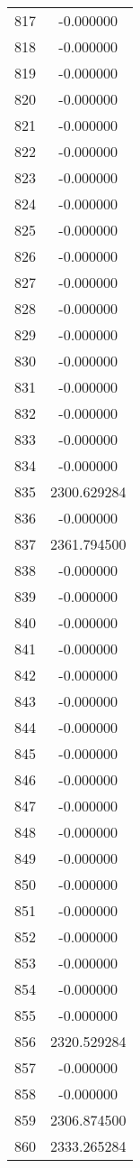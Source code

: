\documentclass[12pt]{article}
\begin{document}
\begin{longtable}{@{}cc@{}}
817 & -0.000000 \\
818 & -0.000000 \\
819 & -0.000000 \\
820 & -0.000000 \\
821 & -0.000000 \\
822 & -0.000000 \\
823 & -0.000000 \\
824 & -0.000000 \\
825 & -0.000000 \\
826 & -0.000000 \\
827 & -0.000000 \\
828 & -0.000000 \\
829 & -0.000000 \\
830 & -0.000000 \\
831 & -0.000000 \\
832 & -0.000000 \\
833 & -0.000000 \\
834 & -0.000000 \\
835 & 2300.629284 \\
836 & -0.000000 \\
837 & 2361.794500 \\
838 & -0.000000 \\
839 & -0.000000 \\
840 & -0.000000 \\
841 & -0.000000 \\
842 & -0.000000 \\
843 & -0.000000 \\
844 & -0.000000 \\
845 & -0.000000 \\
846 & -0.000000 \\
847 & -0.000000 \\
848 & -0.000000 \\
849 & -0.000000 \\
850 & -0.000000 \\
851 & -0.000000 \\
852 & -0.000000 \\
853 & -0.000000 \\
854 & -0.000000 \\
855 & -0.000000 \\
856 & 2320.529284 \\
857 & -0.000000 \\
858 & -0.000000 \\
859 & 2306.874500 \\
860 & 2333.265284 \\

\end{longtable}
\end{document}
